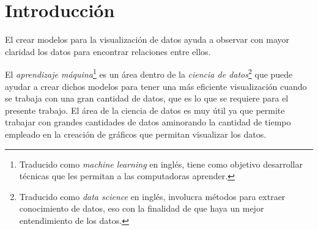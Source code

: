 \documentclass[3p,times]{elsarticle}
\newenvironment{abstracts}
 {\global\setbox\absbox=\vbox\bgroup
    \hsize=\textwidth
    \linespread{1}\selectfont}
 {\vspace{-\bigskipamount}\egroup}
\renewenvironment{abstract}[1][]
 {\if\relax\detokenize{#1}\relax\else\selectlanguage{#1}\fi
  \noindent\textbf{\abstractname}\par\medskip\noindent\ignorespaces}
 {\par\bigskip}
\begin{document}


\section{Introducción}
El crear modelos para la visualización de datos ayuda a observar con mayor claridad los datos para encontrar relaciones entre ellos.

El \emph{aprendizaje máquina}\footnote{Traducido como \emph{machine learning} en inglés, tiene como objetivo desarrollar técnicas que les permitan a las computadoras aprender.} es un área dentro de la \emph{ciencia de datos}\footnote{Traducido como \emph{data science} en inglés, involucra métodos para extraer conocimiento de datos, eso con la finalidad de que haya un mejor entendimiento de los datos.} que puede ayudar a crear dichos modelos para tener una más eficiente visualización cuando se trabaja con una gran cantidad de datos, que es lo que se requiere para el presente trabajo. El área de la ciencia de datos es muy útil ya que permite trabajar con grandes cantidades de datos aminorando la cantidad de tiempo empleado en la creación de gráficos que permitan visualizar los datos.
\end{document}
